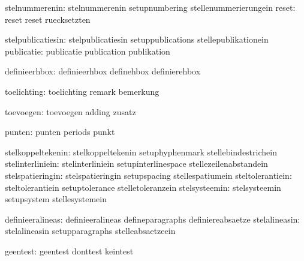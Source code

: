                stelnummerenin:  stelnummerenin               setupnumbering
                                stellenummerierungein
                        reset:  reset                        reset
                                ruecksetzten

            stelpublicatiesin:  stelpublicatiesin            setuppublications
                                stellepublikationein
                   publicatie:  publicatie                   publication
                                publikation

                definieerhbox:  definieerhbox                definehbox
                                definierehbox

                  toelichting:  toelichting                  remark
                                bemerkung

                    toevoegen:  toevoegen                    adding
                                zusatz

                       punten:  punten                       periods
                                punkt

            stelkoppeltekenin:  stelkoppeltekenin            setuphyphenmark
                                stellebindestrichein
             stelinterliniein:  stelinterliniein             setupinterlinespace
                                stellezeilenabstandein
             stelspatieringin:  stelspatieringin             setupspacing
                                stellespatiumein
             steltolerantiein:  steltolerantiein             setuptolerance
                                stelletoleranzein
                stelsysteemin:  stelsysteemin                setupsystem
                                stellesystemein

             definieeralineas:  definieeralineas             defineparagraphs
                                definiereabsaetze
                stelalineasin:  stelalineasin                setupparagraphs
                                stelleabsaetzeein

                     geentest:  geentest                     donttest
                                keintest

\stopcommands



